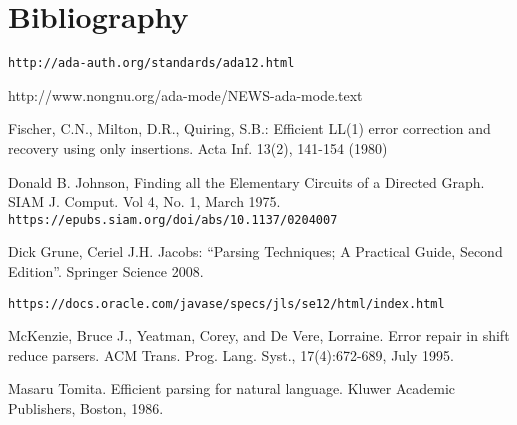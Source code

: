 \documentclass{article}
\begin{document}
\section{Bibliography}
\begin{thebibliography}{9}

 \verb|http://ada-auth.org/standards/ada12.html|

 http://www.nongnu.org/ada-mode/NEWS-ada-mode.text

  Fischer, C.N., Milton, D.R., Quiring, S.B.:
  Efficient LL(1) error correction and recovery using only insertions.
  Acta Inf. 13(2), 141-154 (1980)

 Donald B. Johnson, Finding all the Elementary Circuits of a Directed Graph.
SIAM J. Comput. Vol 4, No. 1, March 1975.\\ \verb|https://epubs.siam.org/doi/abs/10.1137/0204007|

 Dick Grune, Ceriel J.H. Jacobs: ``Parsing Techniques; A Practical Guide, Second
  Edition''. Springer Science  2008.

  \verb|https://docs.oracle.com/javase/specs/jls/se12/html/index.html|

 McKenzie, Bruce J., Yeatman, Corey, and De
  Vere, Lorraine. Error repair in shift reduce parsers. ACM Trans.
  Prog. Lang. Syst., 17(4):672-689, July 1995.

 Masaru Tomita. Efficient parsing for natural language. Kluwer Academic Publishers, Boston, 1986.
\end{thebibliography}
\end{document}
